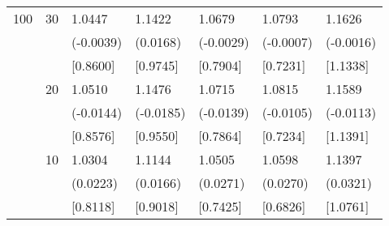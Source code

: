 \begin{table}[H]
{\begin{tabular}{c c | C{2.4cm} | C{2.4cm} | C{2.4cm} | C{2.4cm} | C{2.4cm} }
			100&30&1.0447&1.1422&1.0679&1.0793&1.1626\\
			&&(-0.0039)&(0.0168)&(-0.0029)&(-0.0007)&(-0.0016)\\
			&&[0.8600]&[0.9745]&[0.7904]&[0.7231]&[1.1338]\\
			&20&1.0510&1.1476&1.0715&1.0815&1.1589\\
			&&(-0.0144)&(-0.0185)&(-0.0139)&(-0.0105)&(-0.0113)\\
			&&[0.8576]&[0.9550]&[0.7864]&[0.7234]&[1.1391]\\
			&10&1.0304&1.1144&1.0505&1.0598&1.1397\\
			&&(0.0223)&(0.0166)&(0.0271)&(0.0270)&(0.0321)\\
			&&[0.8118]&[0.9018]&[0.7425]&[0.6826]&[1.0761]\\
			\bottomrule[1.5pt]
	\end{tabular}}
	\label{table:table S.4}
\end{table}

